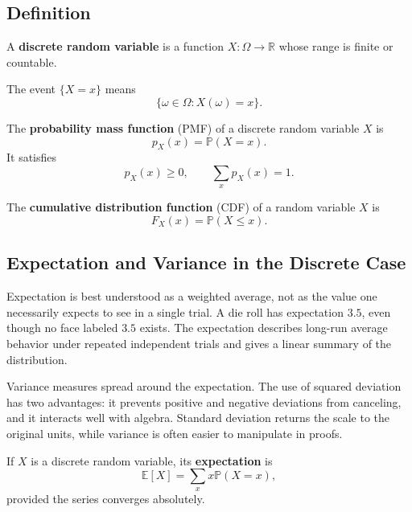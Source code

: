 \subsection{Definition}

\begin{definition}
A \textbf{discrete random variable} is a function $X:\Omega\to\mathbb{R}$ whose range is finite or countable.
\end{definition}

The event $\{X=x\}$ means
\[
    \{\omega\in\Omega:X(\omega)=x\}.
\]

\begin{definition}
The \textbf{probability mass function} (PMF) of a discrete random variable $X$ is
\[
    p_X(x)=\mathbb{P}(X=x).
\]
It satisfies
\[
    p_X(x)\geq 0,
    \qquad
    \sum_x p_X(x)=1.
\]
\end{definition}

\begin{definition}
The \textbf{cumulative distribution function} (CDF) of a random variable $X$ is
\[
    F_X(x)=\mathbb{P}(X\leq x).
\]
\end{definition}

\subsection{Expectation and Variance in the Discrete Case}


Expectation is best understood as a weighted average, not as the value one necessarily expects to see in a single trial. A die roll has expectation $3.5$, even though no face labeled $3.5$ exists. The expectation describes long-run average behavior under repeated independent trials and gives a linear summary of the distribution.

Variance measures spread around the expectation. The use of squared deviation has two advantages: it prevents positive and negative deviations from canceling, and it interacts well with algebra. Standard deviation returns the scale to the original units, while variance is often easier to manipulate in proofs.

\begin{definition}[Expectation]
If $X$ is a discrete random variable, its \textbf{expectation} is
\[
    \mathbb{E}[X]=\sum_x x\mathbb{P}(X=x),
\]
provided the series converges absolutely.
\end{definition}

